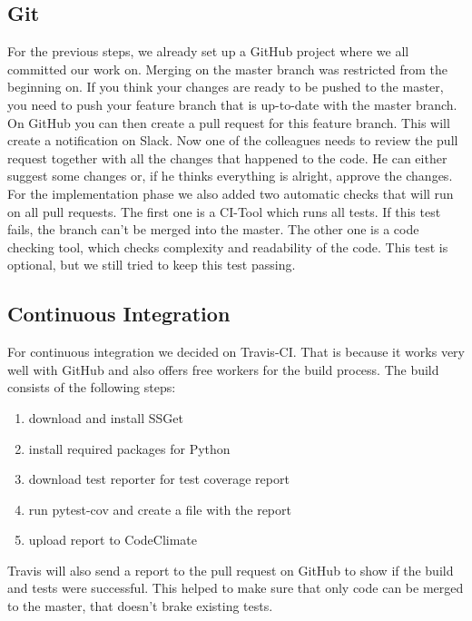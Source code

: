 \documentclass[parskip=full]{scrartcl}
\begin{document}
\subsection{Git}
For the previous steps, we already set up a \gls{GitHub} project where we all committed our work on.
Merging on the master branch was restricted from the beginning on.
If you think your changes are ready to be pushed to the master, you need to push your feature branch that is up-to-date with the master branch.
On \gls{GitHub} you can then create a pull request for this feature branch.
This will create a notification on \gls{Slack}.
Now one of the colleagues needs to review the pull request together with all the changes that happened to the code.
He can either suggest some changes or, if he thinks everything is alright, approve the changes.
For the implementation phase we also added two automatic checks that will run on all pull requests.
The first one is a CI-Tool which runs all tests.
If this test fails, the branch can't be merged into the master.
The other one is a code checking tool, which checks complexity and readability of the code.
This test is optional, but we still tried to keep this test passing.

\subsection{Continuous Integration}
For continuous integration we decided on \gls{Travis}-CI. 
That is because it works very well with GitHub and also offers free workers for the build process.
The build consists of the following steps:

\begin{enumerate}

\item download and install \gls{SSGet}

\item install required packages for \gls{Python}

\item download test reporter for test coverage report

\item run pytest-cov and create a file with the report

\item upload report to \gls{CodeClimate}

\end{enumerate}

\gls{Travis} will also send a report to the pull request on \gls{GitHub} to show if the build and tests were successful.
This helped to make sure that only code can be merged to the master, that doesn't brake existing tests.
\end{document}
